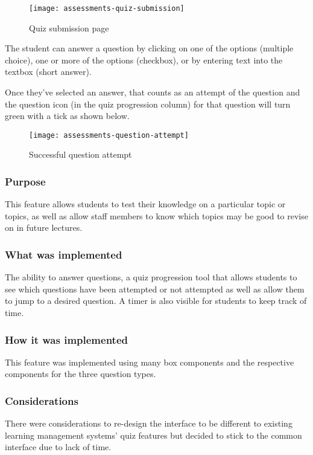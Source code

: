 \begin{figure}[h!]
	\centering
	\texttt{[image: assessments-quiz-submission]}
	\caption{Quiz submission page}
\end{figure}

The student can answer a question by clicking on one of the options (multiple choice), one or more of the options (checkbox), or by entering text into the textbox (short answer). 

Once they've selected an answer, that counts as an attempt of the question and the question icon (in the quiz progression column) for that question will turn green with a tick as shown below.

\begin{figure}[h!]
	\centering
	\texttt{[image: assessments-question-attempt]}
	\caption{Successful question attempt}
\end{figure}

\subsubsection{Purpose}
This feature allows students to test their knowledge on a particular topic or topics, as well as allow staff members to know which topics may be good to revise on in future lectures.

\subsubsection{What was implemented}
The ability to answer questions, a quiz progression tool that allows students to see which questions have been attempted or not attempted as well as allow them to jump to a desired question. A timer is also visible for students to keep track of time. 

\subsubsection{How it was implemented}
This feature was implemented using many box components and the respective components for the three question types.

\subsubsection{Considerations}
There were considerations to re-design the interface to be different to existing learning management systems' quiz features but decided to stick to the common interface due to lack of time.

